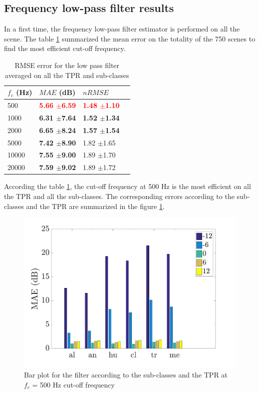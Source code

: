 \documentclass[twocolumn,a4paper,10pt]{article}
\begin{document}
\subsection{Frequency low-pass filter results}
In a first time, the frequency low-pass filter estimator is performed on all the scene. The table \ref{tab:results_filter} summarized the mean error on the totality of the 750 scenes to find the most efficient cut-off frequency. \\

\begin{table}[h]
\centering
\begin{tabular}{llll}
$f_c$ (Hz) & $MAE$ (dB) & $nRMSE$  \\ \hline
 500 & \textbf{\textcolor{red}{5.66 $\pm$6.59}} & \textbf{\textcolor{red}{1.48 $\pm$1.10}} \\
 1000 & \textbf{6.31 $\pm$7.64} & \textbf{1.52 $\pm$1.34} \\
 2000 & \textbf{6.65 $\pm$8.24} & \textbf{1.57 $\pm$1.54} \\
 5000 & \textbf{7.42 $\pm$8.90} & 1.82 $\pm$1.65 \\
10000 & \textbf{7.55 $\pm$9.00} & 1.89 $\pm$1.70 \\
20000 & \textbf{7.59 $\pm$9.02} & 1.89 $\pm$1.72 \\
\end{tabular}
\caption{RMSE error for the low pass filter averaged on all the TPR and sub-classes}
\label{tab:results_filter}
\end{table}

According the table \ref{tab:results_filter}, the cut-off frequency at 500 Hz is the most efficient on all the TPR and all the sub-classes. The corresponding errors according to the sub-classes and the TPR are summarized in the figure \ref{fig:filterAmbiance}.\\

\begin{figure}[hbtp]
\centering
\includegraphics[width=\linewidth]{../image/AmbianceFilter.pdf}
\caption{Bar plot for the filter according to the sub-classes and the TPR at $f_c$ = 500 Hz cut-off frequency}
\label{fig:filterAmbiance}
\end{figure}
\end{document}
